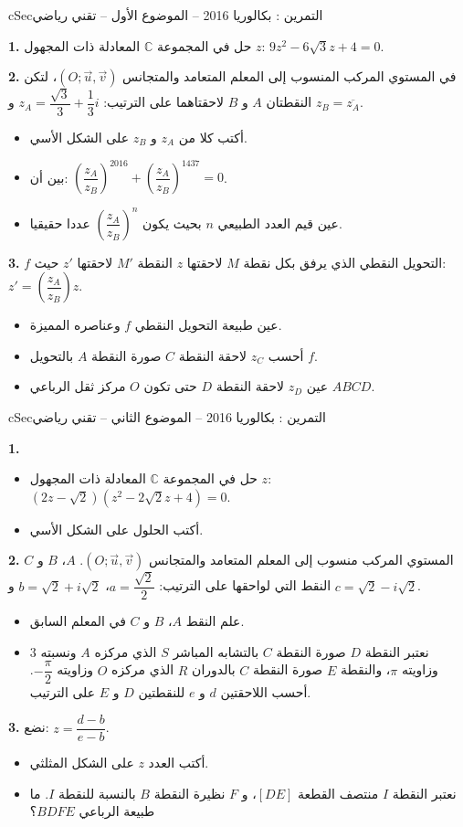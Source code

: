 \documentclass[12pt,a4paper]{article}
\newenvironment{BOX}[2]{\begin{otherlanguage}{english}\begin{arbox}{#1}{#2}}{\end{arbox}\end{otherlanguage}}
\newcounter{exo}
\newenvironment{tamrin}[1]{\stepcounter{exo}\begin{BOX}{cSec}{التمرين \theexo: #1}}{\end{BOX}}
\newenvironment{sq}{\begin{itemize}[leftmargin=2.4em,itemsep=3pt]}{\end{itemize}}
\newcommand{\qa}{\item[(أ)]}\newcommand{\qb}{\item[(ب)]}\newcommand{\qc}{\item[(جـ)]}\newcommand{\qd}{\item[(د)]}\newcommand{\qe}{\item[(هـ)]}
\newcommand{\QQ}[1]{\par\smallskip\textbf{#1.} }
\begin{document}
\begin{tamrin}{بكالوريا 2016 -- الموضوع الأول -- تقني رياضي}
\QQ{1} حل في المجموعة $\mathbb{C}$ المعادلة ذات المجهول $z$: $9z^2-6\sqrt3z+4=0$.

\QQ{2} في المستوي المركب المنسوب إلى المعلم المتعامد والمتجانس $(O;\vec u,\vec v)$، لتكن النقطتان $A$ و $B$ لاحقتاهما على الترتيب: $z_A=\dfrac{\sqrt3}{3}+\dfrac13i$ و $z_B=\overline{z_A}$.
\begin{sq}
\qa أكتب كلا من $z_A$ و $z_B$ على الشكل الأسي.
\qb بين أن: $\left(\dfrac{z_A}{z_B}\right)^{2016}+\left(\dfrac{z_A}{z_B}\right)^{1437}=0$.
\qc عين قيم العدد الطبيعي $n$ بحيث يكون $\left(\dfrac{z_A}{z_B}\right)^n$ عددا حقيقيا.
\end{sq}
\QQ{3} $f$ التحويل النقطي الذي يرفق بكل نقطة $M$ لاحقتها $z$ النقطة $M'$ لاحقتها $z'$ حيث: $z'=\left(\dfrac{z_A}{z_B}\right)z$.
\begin{sq}
\qa عين طبيعة التحويل النقطي $f$ وعناصره المميزة.
\qb أحسب $z_C$ لاحقة النقطة $C$ صورة النقطة $A$ بالتحويل $f$.
\qc عين $z_D$ لاحقة النقطة $D$ حتى تكون $O$ مركز ثقل الرباعي $ABCD$.
\end{sq}
\end{tamrin}

\begin{tamrin}{بكالوريا 2016 -- الموضوع الثاني -- تقني رياضي}
\QQ{1}
\begin{sq}
\qa حل في المجموعة $\mathbb{C}$ المعادلة ذات المجهول $z$: $(2z-\sqrt2)(z^2-2\sqrt2z+4)=0$.
\qb أكتب الحلول على الشكل الأسي.
\end{sq}
\QQ{2} المستوي المركب منسوب إلى المعلم المتعامد والمتجانس $(O;\vec u,\vec v)$. $A$، $B$ و $C$ النقط التي لواحقها على الترتيب: $a=\dfrac{\sqrt2}{2}$، $b=\sqrt2+i\sqrt2$ و $c=\sqrt2-i\sqrt2$.
\begin{sq}
\qa علم النقط $A$، $B$ و $C$ في المعلم السابق.
\qb نعتبر النقطة $D$ صورة النقطة $C$ بالتشابه المباشر $S$ الذي مركزه $A$ ونسبته $3$ وزاويته $\pi$، والنقطة $E$ صورة النقطة $C$ بالدوران $R$ الذي مركزه $O$ وزاويته $-\dfrac{\pi}{2}$.
أحسب اللاحقتين $d$ و $e$ للنقطتين $D$ و $E$ على الترتيب.
\end{sq}
\QQ{3} نضع: $z=\dfrac{d-b}{e-b}$.
\begin{sq}
\qa أكتب العدد $z$ على الشكل المثلثي.
\qb نعتبر النقطة $I$ منتصف القطعة $[DE]$، و $F$ نظيرة النقطة $B$ بالنسبة للنقطة $I$. ما طبيعة الرباعي $BDFE$؟
\end{sq}
\end{tamrin}
\end{document}
